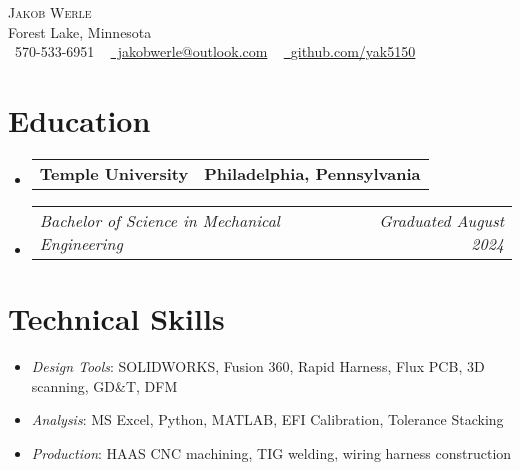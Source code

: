 \documentclass[letterpaper,11pt]{article}
\makeatletter
\newcommand{\company}[2]{
  \vspace{-2pt}\item
  \begin{tabular*}{1.0\textwidth}[t]{l@{\extracolsep{\fill}}r}
    \textbf{#1} & \textbf{\small #2} \\
  \end{tabular*}\vspace{-18pt}
}
\newcommand{\role}[2]{
  \vspace{-5pt}\item
  \begin{tabular*}{1.0\textwidth}[t]{l@{\extracolsep{\fill}}r}
    \textit{\small#1} & \textit{\small #2} \\
  \end{tabular*}\vspace{-20pt}
}
\newcommand{\resumeItemListStart}{
  \begin{itemize}[label=\tiny$\bullet$, leftmargin=0.25in] %
}
\newcommand{\resumeItemListEnd}{
  \end{itemize}\vspace{-5pt}
}
\newcommand{\resumeItem}[1]{
  \item\small{#1 \vspace{-2pt}}
}
\newcommand{\companyListStart}{
  \begin{itemize}[leftmargin=0.0in, label={}]
}
\newcommand{\companyListEnd}{
  \end{itemize}
}
\makeatother
\begin{document}
\begin{center}
    {\Huge \scshape Jakob Werle} \\ \vspace{1pt}
    Forest Lake, Minnesota \\ \vspace{1pt}
    \small \raisebox{-0.1\height}\faPhone\ 570-533-6951 ~ \href{mailto:jakob.werle@temple.edu}{\raisebox{-0.2\height}\faEnvelope\ jakobwerle@outlook.com} ~ 
    \href{https://github.com/yak5150}{\raisebox{-0.2\height}\faGithub\ \underline{github.com/yak5150}}
    \vspace{-8pt}
\end{center}

\section{Education}
  \companyListStart
    \company{Temple University}{Philadelphia, Pennsylvania}
      \role{Bachelor of Science in Mechanical Engineering}{Graduated August 2024}
  \companyListEnd
\vspace{-12pt}

\section{Technical Skills}
    \resumeItemListStart
        \resumeItem{\textit{Design Tools}{: SOLIDWORKS, Fusion 360, Rapid Harness, Flux PCB, 3D scanning, GD\&T}, DFM} \vspace{-5pt}
        \resumeItem{\textit{Analysis}{: MS Excel, Python, MATLAB, EFI Calibration, Tolerance Stacking}}
        \vspace{-5pt}
        \resumeItem{\textit{Production}{: HAAS CNC machining, TIG welding, wiring harness construction}}
    \resumeItemListEnd
 \vspace{-16pt}

\end{document}

